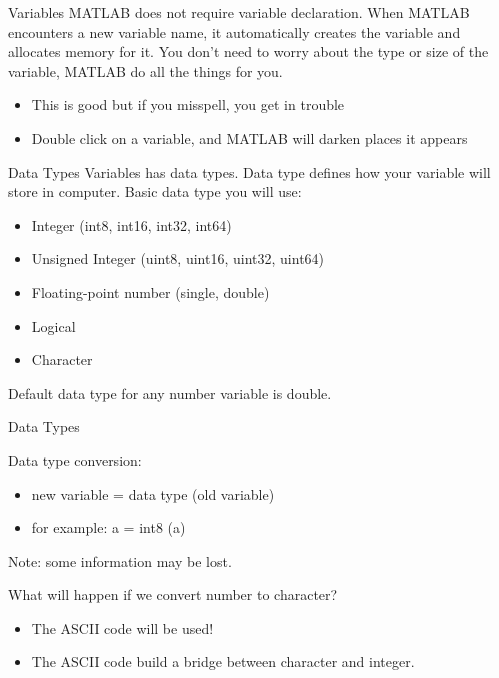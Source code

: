 \begin{frame}{Variables}
MATLAB does not require variable declaration. When MATLAB encounters a new variable name, it automatically creates the variable and allocates memory for it. You don't need to worry about the type or size of the variable, MATLAB do all the things for you. 
\begin{itemize}
\item This is good but if you misspell, you get in trouble 
\item Double click on a variable, and MATLAB will darken places it appears
\end{itemize}
\end{frame}

\begin{frame}{Data Types}
Variables has data types. Data type defines how your variable will store in computer. Basic data type you will use: 
\begin{itemize}
\item Integer (int8, int16, int32, int64)
\item Unsigned Integer (uint8, uint16, uint32, uint64)
\item Floating-point number (single, double)
\item Logical
\item Character
\end{itemize}
Default data type for any number variable is double.
\end{frame}

\begin{frame}{Data Types}
\begin{block}{Data type conversion:}
\begin{itemize}
\item new variable = data type (old variable)
\item for example: a = int8 (a)
\end{itemize}
Note: some information may be lost.
\end{block}
What will happen if we convert number to character?
\begin{itemize}
\item The ASCII code will be used!
\item The ASCII code build a bridge between character and integer.
\end{itemize}
\end{frame}

